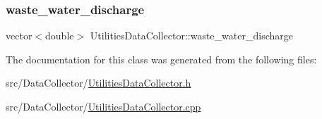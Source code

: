 \subsubsection{\texorpdfstring{waste\+\_\+water\+\_\+discharge}{waste\_water\_discharge}}
{\footnotesize\ttfamily vector$<$double$>$ Utilities\+Data\+Collector\+::waste\+\_\+water\+\_\+discharge\hspace{0.3cm}{\ttfamily [private]}}



The documentation for this class was generated from the following files\+:\begin{DoxyCompactItemize}
\item 
src/\+Data\+Collector/\mbox{\hyperlink{UtilitiesDataCollector_8h}{Utilities\+Data\+Collector.\+h}}\item 
src/\+Data\+Collector/\mbox{\hyperlink{UtilitiesDataCollector_8cpp}{Utilities\+Data\+Collector.\+cpp}}\end{DoxyCompactItemize}
